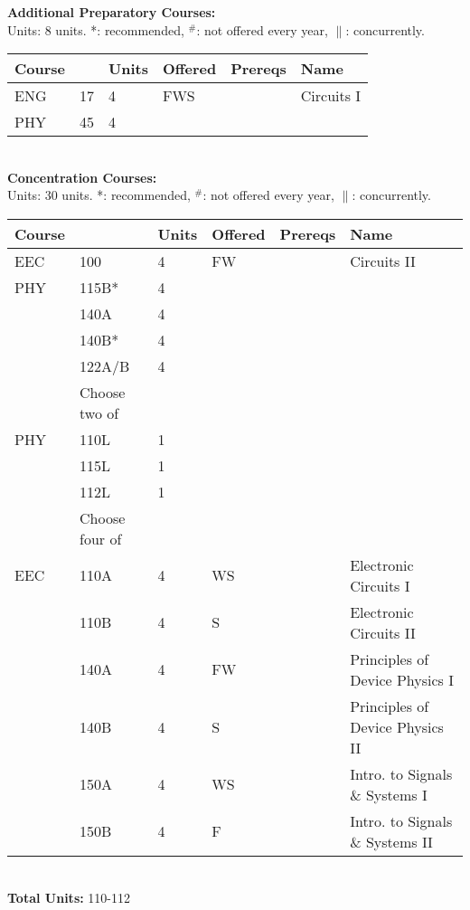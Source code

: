 \documentclass[12pt]{article}
\begin{document}
\newpage
{}
\vskip 0.25cm
\noindent
{\bf Additional Preparatory Courses:  }\\
Units:  8 units. *: recommended, $^\#$: not offered every year, $\parallel$: concurrently.\\
\begin{tabular}{|llllll|}
\hline
Course & & Units & Offered & Prereqs & Name \\
\hline
ENG & 17     & 4 & FWS & & Circuits I\\
PHY & 45     & 4 & & & \\
\hline
\end{tabular}\\
\vskip 0.25cm
\noindent
{\bf Concentration Courses:  }\\
Units:  30 units. *: recommended, $^\#$: not offered every year, $\parallel$: concurrently.\\
\begin{tabular}{|llllll|}
\hline
Course & & Units & Offered & Prereqs & Name \\
\hline
EEC & 100    & 4 & FW & & Circuits II\\
PHY & 115B*  & 4 & & & \\
    & 140A   & 4 & & & \\
    & 140B*  & 4 & & & \\
    & 122A/B & 4 & & & \\
\hline
\hline
    & Choose two of & & & & \\
\hline
PHY & 110L & 1 & & & \\
    & 115L & 1 & & & \\
    & 112L & 1 & & & \\
\hline
\hline
    & Choose four of & & & & \\
\hline
EEC & 110A  & 4 & WS & & Electronic Circuits I \\
    & 110B  & 4 & S  & & Electronic Circuits II\\
    & 140A  & 4 & FW & & Principles of Device Physics I\\
    & 140B  & 4 & S & & Principles of Device Physics II\\
    & 150A  & 4 & WS & & Intro. to Signals \& Systems I\\
    & 150B  & 4 & F & & Intro. to Signals \& Systems II\\
\hline
\end{tabular}\\
\vskip 0.25cm
\noindent
{\bf Total Units:} 110-112\\
\end{document}
